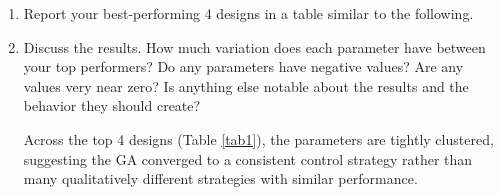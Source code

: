 \documentclass{article}
\begin{document}
\begin{enumerate}
\item{Report your best-performing 4 designs in a table similar to the following. 
\begin{table}[H]
\begin{center}
\scriptsize
\setlength{\tabcolsep}{2.5pt}
\renewcommand{\arraystretch}{1.15}
\caption{Top 4 design strings (15 parameters) and resulting cost $\Pi$.}\label{tab1}
\end{center}
\end{table}}

\newpage



\item Discuss the results. How much variation does each parameter have between your top performers? Do any parameters have negative values? Are any values very near zero? Is anything else notable about the results and the behavior they should create? 
\begin{answer}
Across the top 4 designs (Table \ref{tab1}), the parameters are tightly clustered, suggesting the GA converged to a consistent control strategy rather than many qualitatively different strategies with similar performance.


\end{answer}
\end{enumerate}
\end{document}
